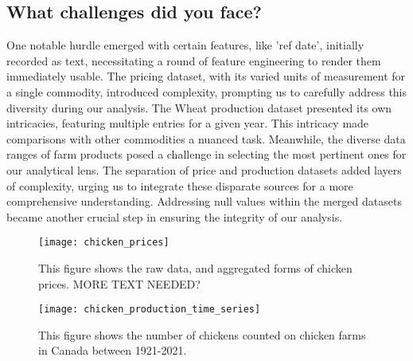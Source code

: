 \subsection{What challenges did you face?}

One notable hurdle emerged with certain features, like 'ref date', initially recorded as text, necessitating a round of feature engineering to render them immediately usable. The pricing dataset, with its varied units of measurement for a single commodity, introduced complexity, prompting us to carefully address this diversity during our analysis. The Wheat production dataset presented its own intricacies, featuring multiple entries for a given year. This intricacy made comparisons with other commodities a nuanced task. Meanwhile, the diverse data ranges of farm products posed a challenge in selecting the most pertinent ones for our analytical lens. The separation of price and production datasets added layers of complexity, urging us to integrate these disparate sources for a more comprehensive understanding. Addressing null values within the merged datasets became another crucial step in ensuring the integrity of our analysis.


\begin{figure}
    \texttt{[image: chicken\_prices]}
    \caption{This figure shows the raw data, and aggregated forms of chicken prices. MORE TEXT NEEDED?}
    \label{fig:chicken_prices}
\end{figure}


\begin{figure}
    \texttt{[image: chicken\_production\_time\_series]}
    \caption{This figure shows the number of chickens counted on chicken farms in Canada between 1921-2021.}
    \label{fig:chicken_production}
\end{figure}